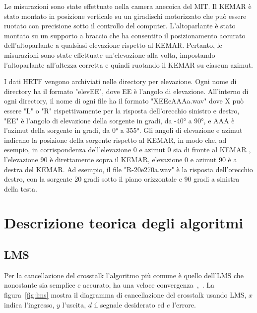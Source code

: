 \documentclass[12pt,a4paper,titlepage]{article}
\begin{document}
Le misurazioni sono state effettuate nella camera anecoica del MIT. Il KEMAR è stato montato in posizione verticale su un giradischi motorizzato che può essere ruotato con precisione sotto il controllo del computer. L'altoparlante è stato montato su un supporto a braccio che ha consentito il posizionamento accurato dell'altoparlante a qualsiasi elevazione rispetto al KEMAR. Pertanto, le misurazioni sono state effettuate un'elevazione alla volta, impostando l'altoparlante all'altezza corretta e quindi ruotando il KEMAR su ciascun azimut.

I dati HRTF vengono archiviati nelle directory per elevazione. Ogni nome di directory ha il formato "elevEE", dove EE è l'angolo di elevazione. All'interno di ogni directory, il nome di ogni file ha il formato "XEEeAAAa.wav" dove X può essere "L" o "R" rispettivamente per la risposta dell'orecchio sinistro e destro, "EE" è l'angolo di elevazione della sorgente in gradi, da -40° a 90°, e AAA è l'azimut della sorgente in gradi, da 0° a 355°. Gli angoli di elevazione e azimut indicano la posizione della sorgente rispetto al KEMAR, in modo che, ad esempio, in corrispondenza dell'elevazione 0 e azimut 0 sia di fronte al KEMAR , l'elevazione 90 è direttamente sopra il KEMAR, elevazione 0 e azimut 90 è a destra del KEMAR. Ad esempio, il file "R-20e270a.wav" è la risposta dell'orecchio destro, con la sorgente 20 gradi sotto il piano orizzontale e 90 gradi a sinistra della testa.
\clearpage
\section{Descrizione teorica degli algoritmi}
\label{sec:descrizione_teorica}
\subsection{LMS}
\label{subsec:LMS_teoria}
Per la cancellazione del crosstalk l'algoritmo più comune è quello dell'LMS che nonostante sia semplice e accurato, ha una veloce convergenza~\cite{143434},~\cite{4217047}. La figura~\ref{fig:lms} mostra il diagramma di cancellazione del crosstalk usando LMS, $x$ indica l'ingresso, $y$ l'uscita, $d$ il segnale desiderato ed $e$ l'errore.
\end{document}
